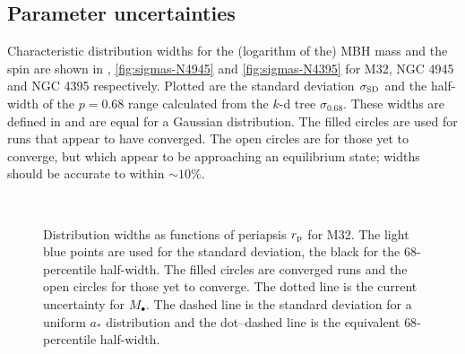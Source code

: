 \subsection{Parameter uncertainties}

Characteristic distribution widths for the (logarithm of the) MBH mass and the spin are shown in , \ref{fig:sigmas-N4945} and \ref{fig:sigmas-N4395} for M32, NGC 4945 and NGC 4395 respectively. Plotted are the standard deviation $\sigma_\mathrm{SD}$ and the half-width of the $p = 0.68$ range calculated from the $k$-d tree $\sigma_{0.68}$. These widths are defined in  and are equal for a Gaussian distribution. The filled circles are used for runs that appear to have converged. The open circles are for those yet to converge, but which appear to be approaching an equilibrium state; widths should be accurate to within $\sim 10\%$.
\begin{figure}%
\centering
{} \quad
{} \\
\caption{Distribution widths as functions of periapsis $r_\mathrm{p}$ for M32. The light blue points are used for the standard deviation, the black for the $68$-percentile half-width. The filled circles are converged runs and the open circles for those yet to converge. The dotted line is the current uncertainty for $M_\bullet$. The dashed line is the standard deviation for a uniform $a_\ast$ distribution and the dot--dashed line is the equivalent $68$-percentile half-width.}
\label{fig:sigmas-M32}
\end{figure}

